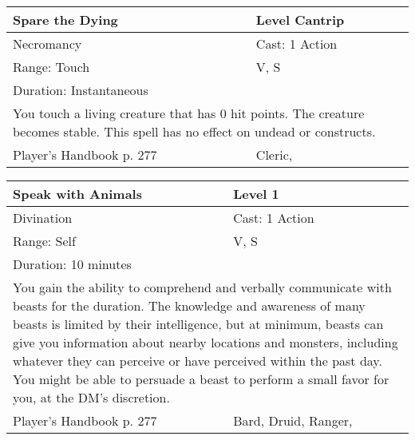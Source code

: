\documentclass[11pt]{report}
\begin{document}
\begin{table}[H]
	\begin{tabular}{||p{6cm}|p{6cm}||}
		\hline\hline
		\bf{Spare the Dying} & Level Cantrip\\ \hline
		Necromancy & Cast: 1 Action\\ \hline
		Range: Touch & V, S\\ \hline
		Duration: Instantaneous & \\ \hline
		\multicolumn{2}{||p{12cm}||}{You touch a living creature that has 0 hit points. The creature becomes stable. This spell has no effect on undead or constructs.}\\ \hline
Player's Handbook p. 277 & Cleric, \\ \hline\hline
	\end{tabular}
\end{table}

\begin{table}[H]
	\begin{tabular}{||p{6cm}|p{6cm}||}
		\hline\hline
		\bf{Speak with Animals} & Level 1\\ \hline
		Divination & Cast: 1 Action\\ \hline
		Range: Self & V, S\\ \hline
		Duration: 10 minutes & \\ \hline
		\multicolumn{2}{||p{12cm}||}{You gain the ability to comprehend and verbally communicate with beasts for the duration.
The knowledge and awareness of many beasts is limited by their intelligence, but at minimum, beasts can give you information about nearby locations and monsters, including whatever they can perceive or have perceived within the past day. You might be able to persuade a beast to perform a small favor for you, at the DM’s discretion.}\\ \hline
Player's Handbook p. 277 & Bard, Druid, Ranger, \\ \hline\hline
	\end{tabular}
\end{table}
\end{document}
